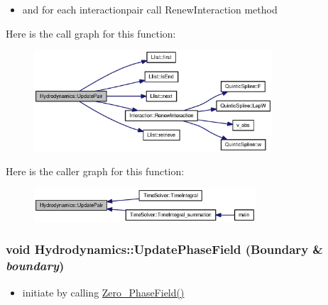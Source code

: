 \begin{itemize}
\item and for each interactionpair call RenewInteraction method \end{itemize}


Here is the call graph for this function:\nopagebreak
\begin{figure}[H]
\begin{center}
\leavevmode
\includegraphics[width=251pt]{classHydrodynamics_cf0d749b11e8b8474dd204c6ea080235_cgraph}
\end{center}
\end{figure}


Here is the caller graph for this function:\nopagebreak
\begin{figure}[H]
\begin{center}
\leavevmode
\includegraphics[width=234pt]{classHydrodynamics_cf0d749b11e8b8474dd204c6ea080235_icgraph}
\end{center}
\end{figure}
\hypertarget{classHydrodynamics_c87ff6437d540454ed7de2f726858f4a}{
\subsubsection[{UpdatePhaseField}]{\setlength{\rightskip}{0pt plus 5cm}void Hydrodynamics::UpdatePhaseField ({\bf Boundary} \& {\em boundary})}}
\label{classHydrodynamics_c87ff6437d540454ed7de2f726858f4a}




\begin{itemize}
\item initiate by calling \hyperlink{classHydrodynamics_dedab91b9a62eb7e26931cbbe73f79cc}{Zero\_\-PhaseField()}\end{itemize}


